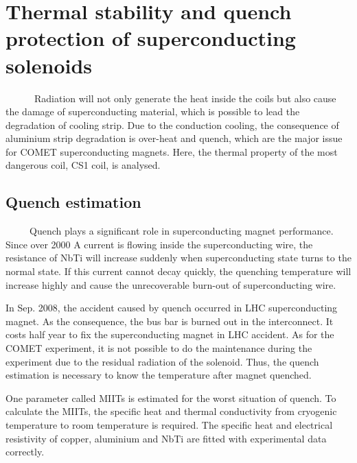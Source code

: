\chapter{Thermal stability and quench protection of superconducting solenoids}
~~~~~~Radiation will not only generate the heat inside the coils but also cause the damage of superconducting material, which is possible to lead the degradation of cooling strip.
Due to the conduction cooling, the consequence of aluminium strip degradation is over-heat and quench, which are the major issue for COMET superconducting magnets.
Here, the thermal property of the most dangerous coil, CS1 coil, is analysed.

\section{Quench estimation}
~~~~~Quench plays a significant role in superconducting magnet performance.
Since over 2000 A current is flowing inside the superconducting wire, the resistance of NbTi will increase suddenly when superconducting state turns to the normal state.
If this current cannot decay quickly, the quenching temperature will increase highly and cause the unrecoverable burn-out of superconducting wire.

In Sep. 2008, the accident caused by quench occurred in LHC superconducting magnet.
As the consequence, the bus bar is burned out in the interconnect.
It costs half year to fix the superconducting magnet in LHC accident.
As for the COMET experiment, it is not possible to do the maintenance during the experiment due to the residual radiation of the solenoid.
Thus, the quench estimation is necessary to know the temperature after magnet quenched.

One parameter called MIITs is estimated for the worst situation of quench.
To calculate the MIITs, the specific heat and thermal conductivity from cryogenic temperature to room temperature is required.
The specific heat and electrical resistivity of copper, aluminium and NbTi are fitted with experimental data correctly.

